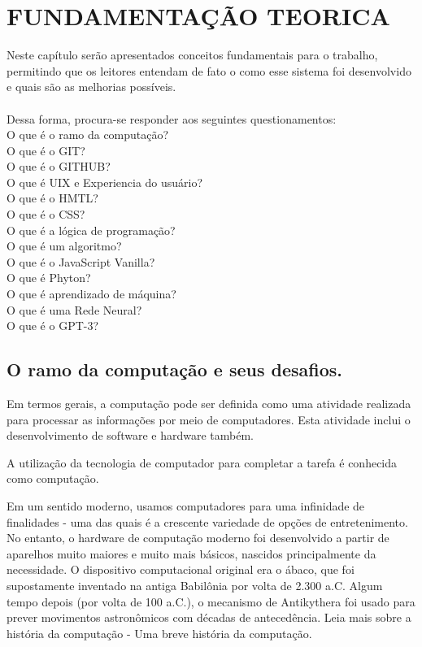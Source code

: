 
\chapter{FUNDAMENTAÇÃO TEORICA}
\label{chap:delimitacao}

Neste capítulo serão apresentados conceitos fundamentais para o trabalho, permitindo que os leitores entendam de fato o como esse sistema foi desenvolvido e quais são as melhorias possíveis.\\
\\
Dessa forma, procura-se responder aos seguintes questionamentos:\\
O que é o ramo da computação?\\
O que é o GIT?\\
O que é o GITHUB?\\ 
O que é UIX e Experiencia do usuário?\\ 
O que é o HMTL?\\
O que é o CSS?\\
O que é a lógica de programação?\\ 
O que é um algoritmo?\\
O que é o JavaScript Vanilla?\\
O que é Phyton?\\
O que é aprendizado de máquina?\\
O que é uma Rede Neural?\\
O que é o GPT-3? 

\section{O ramo da computação e seus desafios.}
\label{sec:RamoComputacaoDesafios}
Em termos gerais, a computação pode ser definida como uma atividade realizada para processar as informações por meio de computadores. Esta atividade inclui o desenvolvimento de software e hardware também.

A utilização da tecnologia de computador para completar a tarefa é conhecida como computação.

Em um sentido moderno, usamos computadores para uma infinidade de finalidades - uma das quais é a crescente variedade de opções de entretenimento. No entanto, o hardware de computação moderno foi desenvolvido a partir de aparelhos muito maiores e muito mais básicos, nascidos principalmente da necessidade. O dispositivo computacional original era o ábaco, que foi supostamente inventado na antiga Babilônia por volta de 2.300 a.C. Algum tempo depois (por volta de 100 a.C.), o mecanismo de Antikythera foi usado para prever movimentos astronômicos com décadas de antecedência. Leia mais sobre a história da computação - Uma breve história da computação. 

